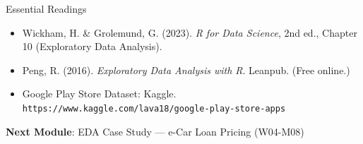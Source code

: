 \documentclass[10pt]{beamer}
\begin{document}
\begin{frame}{Essential Readings}
  \begin{itemize}
    \item Wickham, H. \& Grolemund, G. (2023). \emph{R for Data Science},
          2nd ed., Chapter 10 (Exploratory Data Analysis).
    \item Peng, R. (2016). \emph{Exploratory Data Analysis with R}.
          Leanpub. (Free online.)
    \item Google Play Store Dataset: Kaggle.
          \texttt{https://www.kaggle.com/lava18/google-play-store-apps}
  \end{itemize}
  \vspace{6pt}
  \textbf{Next Module}: EDA Case Study --- e-Car Loan Pricing (W04-M08)
\end{frame}
\end{document}
